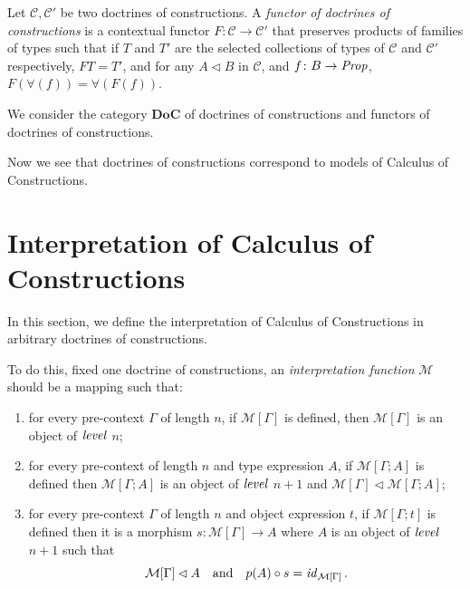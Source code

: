 \begin{definition}
    Let $\mathcal{C}, \mathcal{C}'$ be two doctrines of constructions.
    A \textit{functor of doctrines of constructions} is a contextual functor $F \colon \mathcal{C} \to \mathcal{C}'$
    that preserves products of families of types such that if $T$ and $T'$ are the selected collections of types 
    of $\mathcal{C}$ and $\mathcal{C}'$ respectively, $F T = T'$, and for any $A \lhd B$ in $\mathcal{C}$, 
    and $f \colon B \to \operatorname{\mathit{Prop}}$, $F(\forall(f)) = \forall(F(f))$.
\end{definition}

We consider the category $\mathbf{DoC}$ of doctrines of constructions and functors of doctrines of constructions.

Now we see that doctrines of constructions correspond to models of Calculus of Constructions.

\section{Interpretation of Calculus of Constructions}

In this section, we define the interpretation of Calculus of Constructions in arbitrary
doctrines of constructions. 

To do this, fixed one doctrine of constructions, an \textit{interpretation function} $\mathcal{M}$ should be a
mapping such that:
\begin{enumerate}
    \item for every pre-context $\Gamma$ of length $n$, if $\mathcal{M}[\Gamma]$ is defined, then 
          $\mathcal{M}[\Gamma]$ is an object of $\operatorname{\mathit{level}}$ $n$;
    \item for every pre-context of length $n$ and type expression $A$, 
          if $\mathcal{M}[\Gamma ; A]$ is defined then $\mathcal{M}[\Gamma ; A]$ is an object 
          of $\operatorname{\mathit{level}}$ $n + 1$ and $\mathcal{M}[\Gamma] \lhd \mathcal{M}[\Gamma; A]$; 
    \item for every pre-context $\Gamma$ of length $n$ and object expression $t$, 
          if $\mathcal{M}[\Gamma; t]$ is defined then it is a morphism $s \colon \mathcal{M}[\Gamma] \to A$
          where $A$ is an object of $\operatorname{\mathit{level}}$ $n + 1$ such that \[
          \mathcal{M}[\Gamma] \lhd A \quad \text{and} \quad p(A) \circ s = \operatorname{\mathit{id}}_{\mathcal{M}[\Gamma]}.
          \]
\end{enumerate} 

